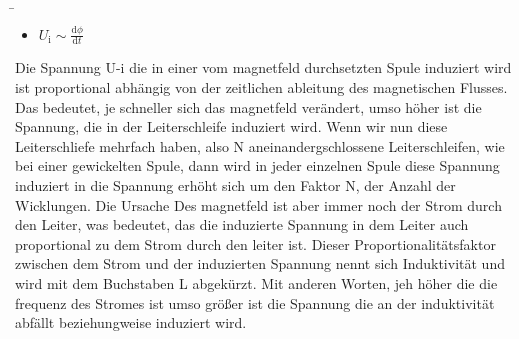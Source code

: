 
\begin{frame}[t]
	\b{
			\begin{itemize}\centering
				\item $ \displaystyle U_\mathrm{i} \sim \frac{\mathrm{d}\phi}{\mathrm{d}t}$\vspace{0.5cm}

	\end{itemize}
	}
	{Die Spannung U-i die in einer vom magnetfeld durchsetzten Spule induziert wird ist proportional abhängig von der zeitlichen ableitung des magnetischen Flusses. Das bedeutet, je schneller sich das magnetfeld verändert, umso höher ist die Spannung, die in der Leiterschleife induziert wird.}
	{Wenn wir nun diese Leiterschliefe mehrfach haben, also N aneinandergschlossene Leiterschleifen, wie bei einer gewickelten Spule, dann wird in jeder einzelnen Spule diese Spannung induziert in die Spannung erhöht sich um den Faktor N, der Anzahl der Wicklungen.
	}
	{Die Ursache Des magnetfeld ist aber immer noch der Strom durch den Leiter, was bedeutet, das die induzierte Spannung in dem Leiter auch proportional zu dem Strom durch den leiter ist.
	}
	{Dieser Proportionalitätsfaktor zwischen dem Strom und der induzierten Spannung nennt sich Induktivität und wird mit dem Buchstaben L abgekürzt.
	Mit anderen Worten, jeh höher die die frequenz des Stromes ist umso größer ist die Spannung die an der induktivität abfällt beziehungweise induziert wird.
	}
\end{frame}

